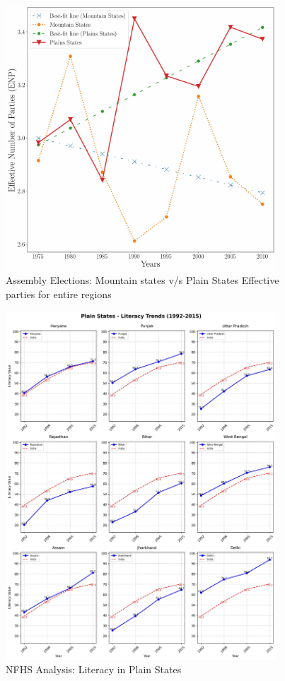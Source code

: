 \begin{figure}[htbp]
    \centering
    \includegraphics[width=0.9\textwidth]{figures/assembly/assembly_final_adjusted.pdf}
    \caption{Assembly Elections:  Mountain states v/s Plain States Effective parties for entire regions}
    \label{img:assembly_overall_enp}
\end{figure}




\begin{figure}[H]
    \centering
    \includegraphics[width=0.9\textwidth]{figures/nfhs/plain_states_literacy_subplots.pdf}
    \caption{NFHS Analysis: Literacy in Plain States}
    \label{fig:nfhs_plain_literacy}
\end{figure}

